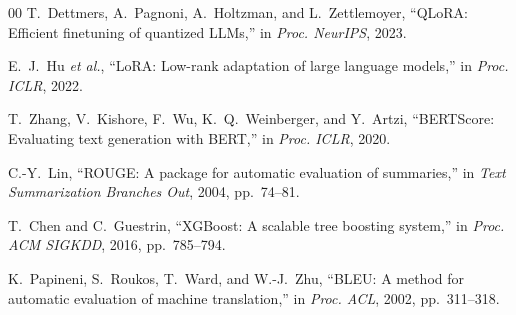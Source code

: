 \documentclass[conference]{IEEEtran}
\begin{document}
\begin{thebibliography}{00}
 T.~Dettmers, A.~Pagnoni, A.~Holtzman, and L.~Zettlemoyer, ``QLoRA: Efficient finetuning of quantized LLMs,'' in \textit{Proc. NeurIPS}, 2023.

 E.~J.~Hu \textit{et al.}, ``LoRA: Low-rank adaptation of large language models,'' in \textit{Proc. ICLR}, 2022.

 T.~Zhang, V.~Kishore, F.~Wu, K.~Q.~Weinberger, and Y.~Artzi, ``BERTScore: Evaluating text generation with BERT,'' in \textit{Proc. ICLR}, 2020.

 C.-Y.~Lin, ``ROUGE: A package for automatic evaluation of summaries,'' in \textit{Text Summarization Branches Out}, 2004, pp.~74--81.

 T.~Chen and C.~Guestrin, ``XGBoost: A scalable tree boosting system,'' in \textit{Proc. ACM SIGKDD}, 2016, pp.~785--794.

 K.~Papineni, S.~Roukos, T.~Ward, and W.-J.~Zhu, ``BLEU: A method for automatic evaluation of machine translation,'' in \textit{Proc. ACL}, 2002, pp.~311--318.

\end{thebibliography}
\end{document}
